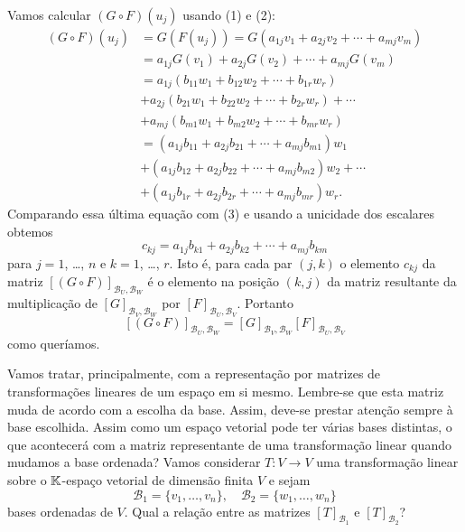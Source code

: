 \begin{prova}
  Vamos calcular $(G\circ F)(u_j)$ usando (1) e (2):
  \begin{align*}
    (G\circ F)(u_j) &= G(F(u_j)) = G(a_{1j}v_1 + a_{2j}v_2 + \cdots + a_{mj}v_m)\\
    &= a_{1j}G(v_1) + a_{2j}G(v_2) + \cdots + a_{mj}G(v_m)\\
    &= a_{1j}(b_{11}w_1 + b_{12}w_2 + \cdots + b_{1r}w_r) \\ &+ a_{2j}(b_{21}w_1 + b_{22}w_2 + \cdots + b_{2r}w_r) + \cdots \\ &+ a_{mj}(b_{m1}w_1 + b_{m2}w_2 + \cdots + b_{mr}w_r)\\
    &= (a_{1j}b_{11} + a_{2j}b_{21} + \cdots + a_{mj}b_{m1})w_1 \\ &+ (a_{1j}b_{12} + a_{2j}b_{22} + \cdots + a_{mj}b_{m2})w_2 + \cdots \\ &+ (a_{1j}b_{1r} + a_{2j}b_{2r} + \cdots + a_{mj}b_{mr})w_r.
  \end{align*}
  Comparando essa última equação com (3) e usando a unicidade dos escalares obtemos
  \[
    c_{kj} = a_{1j}b_{k1} + a_{2j}b_{k2} + \cdots + a_{mj}b_{km}
  \]
  para $j=1$, \dots, $n$ e $k = 1$, \dots, $r$. Isto é, para cada par $(j,k)$ o elemento $c_{kj}$ da matriz $[(G\circ F)]_{{\mathcal{B}_U},{\mathcal{B}_W}}$ é o elemento na posição $(k,j)$ da matriz resultante da multiplicação de $[G]_{{\mathcal{B}_V},{\mathcal{B}_W}}$ por $[F]_{{\mathcal{B}_U},{\mathcal{B}_V}}$. Portanto
  \[
    [(G\circ F)]_{{\mathcal{B}_U},{\mathcal{B}_W}} = [G]_{{\mathcal{B}_V},{\mathcal{B}_W}}[F]_{{\mathcal{B}_U},{\mathcal{B}_V}}
  \]
  como queríamos.
\end{prova}

Vamos tratar, principalmente, com a representação por matrizes de transformações lineares de um espaço em si mesmo. Lembre-se que esta matriz muda de acordo com a escolha da base. Assim, deve-se prestar atenção sempre \`a base escolhida. Assim como um espaço vetorial pode ter várias bases distintas, o que acontecerá com a matriz representante de uma transformação linear quando mudamos a base ordenada? Vamos considerar $T \colon V \to V$ uma transformação linear sobre o $\mathbb{K}$-espaço vetorial de dimensão finita $V$ e sejam
\[
  \mathcal{B}_1 = \{v_1,\dots,v_n\}, \quad \mathcal{B}_2 = \{w_1,\dots,w_n\}
\]
bases ordenadas de $V$. Qual a relação entre as matrizes $[T]_{\mathcal{B}_1}$ e $[T]_{\mathcal{B}_2}$?


